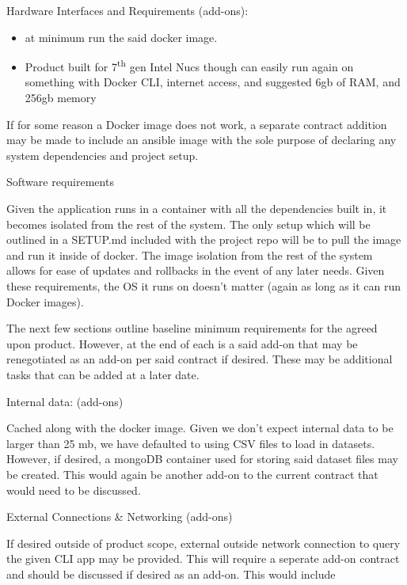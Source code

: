 \documentclass[
]{article}
\begin{document}
Hardware Interfaces and Requirements (add-ons):

\begin{itemize}
\item
  at minimum run the said docker image.
\item
  Product built for 7\textsuperscript{th} gen Intel Nucs though can
  easily run again on something with Docker CLI, internet access, and
  suggested 6gb of RAM, and 256gb memory
\end{itemize}

If for some reason a Docker image does not work, a separate contract
addition may be made to include an ansible image with the sole purpose
of declaring any system dependencies and project setup.

Software requirements

Given the application runs in a container with all the dependencies
built in, it becomes isolated from the rest of the system. The only
setup which will be outlined in a SETUP.md included with the project
repo will be to pull the image and run it inside of docker. The image
isolation from the rest of the system allows for ease of updates and
rollbacks in the event of any later needs. Given these requirements, the
OS it runs on doesn't matter (again as long as it can run Docker
images).

The next few sections outline baseline minimum requirements for the
agreed upon product. However, at the end of each is a said add-on that
may be renegotiated as an add-on per said contract if desired. These may
be additional tasks that can be added at a later date.

Internal data: (add-ons)

Cached along with the docker image. Given we don't expect internal data
to be larger than 25 mb, we have defaulted to using CSV files to load in
datasets. However, if desired, a mongoDB container used for storing said
dataset files may be created. This would again be another add-on to the
current contract that would need to be discussed.

External Connections \& Networking (add-ons)

If desired outside of product scope, external outside network connection
to query the given CLI app may be provided. This will require a seperate
add-on contract and should be discussed if desired as an add-on. This
would include
\end{document}
